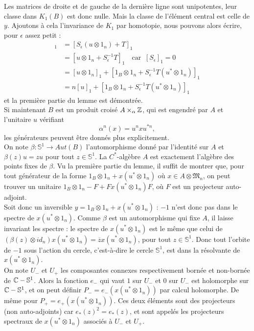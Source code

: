 \begin{dem}
Les matrices de droite et de gauche de la dernière ligne sont unipotentes, leur classe dans $K_1(B)$ est donc nulle. Mais la classe de l'élément central est celle de $y$. Ajoutons à cela l'invariance de $K_1$ par homotopie, nous pouvons alors écrire, pour $\epsilon$ assez petit :
\begin{align*}[y]_1 & =[S_\epsilon(u\otimes 1_n)+T]_1
	\\		&= [u\otimes 1_n +S_\epsilon^{-1}T]_1 \quad \text{car } \ [S_\epsilon]_1=0	
	\\ 		&=[u\otimes 1_n]_1+[1_B\otimes 1_n +S_\epsilon^{-1}T(u^*\otimes 1_n)]_1
	\\		&=n[u]_1+[1_B\otimes 1_n +S_\epsilon^{-1}T(u^*\otimes 1_n)]_1
\end{align*}
et la première partie du lemme est démontrée.\\

Si maintenant $B$ est un produit croisé $A\times_\alpha \mathbb Z$, qui est engendré par $A$ et l'unitaire $u$ vérifiant 
\[\alpha^n(x)=u^n x u^{*n},\]
les générateurs peuvent être donnés plus explicitement.\\

On note $\beta : \mathbb S^1 \rightarrow  Aut(B)$ l'automorphisme donné par l'identité sur $A$ et $\beta(z)u=zu$ pour tout $z\in \mathbb S^1$. La $C^*$-algèbre $A$ est exactement l'algèbre des points fixes de $\beta$. Vu la première partie du lemme, il suffit de montrer que, pour tout générateur de la forme $1_B\otimes 1_n +x(u^*\otimes 1_n)$ où $x\in A\otimes\mathfrak M_n$, on peut trouver un unitaire $1_B\otimes 1_n-F+Fx(u^*\otimes 1_n)F$, où $F$ est un projecteur auto-adjoint.\\

Soit donc un inversible $y=1_B\otimes 1_n +x(u^*\otimes 1_n)$ : $-1$ n'est donc pas dans le spectre de $x(u^*\otimes 1_n)$. Comme $\beta$ est un automorphisme qui fixe $A$, il laisse invariant les spectre : le spectre de $x(u^*\otimes 1_n)$ est le même que celui de $(\beta(z)\otimes id_n)x(u^*\otimes 1_n)=\overline z x(u^*\otimes 1_n)$, pour tout $z\in \mathbb S^1$. Donc tout l'orbite de $-1$ sous l'action du cercle, c'est-à-dire le cercle $\mathbb S^1$, est dans la résolvante de $x(u^*\otimes 1_n)$.\\

On note $U_-$ et $U_+$ les composantes connexes respectivement bornée et non-bornée de $\mathbb C - \mathbb S^1$. Alors la fonction $e_-$ qui vaut $1$ sur $U_-$ et $0$ sur $U_-$ est holomorphe sur $\mathbb C - \mathbb S^1$, et on peut définir $P_-=e_-(x(u^*\otimes 1_n))$ par calcul holomorphe. De même pour $P_+=e_+(x(u^*\otimes 1_n))$. Ces deux éléments sont des projecteurs (non auto-adjoints) car $e_*(z)^2=e_*(z)$, et sont appelés les projecteurs spectraux de $x(u^*\otimes 1_n)$ associés à $U_-$ et $U_+$.\\


\end{dem}
